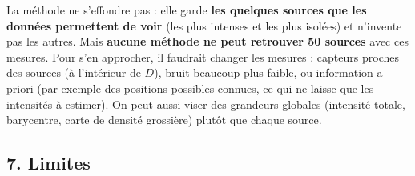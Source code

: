 \documentclass[
  french,
]{article}
\begin{document}
La méthode ne s'effondre pas : elle garde \textbf{les quelques sources
que les données permettent de voir} (les plus intenses et les plus
isolées) et n'invente pas les autres. Mais \textbf{aucune méthode ne
peut retrouver 50 sources} avec ces mesures. Pour s'en approcher, il
faudrait changer les mesures : capteurs proches des sources (à
l'intérieur de \(D\)), bruit beaucoup plus faible, ou information a
priori (par exemple des positions possibles connues, ce qui ne laisse
que les intensités à estimer). On peut aussi viser des grandeurs
globales (intensité totale, barycentre, carte de densité grossière)
plutôt que chaque source.

\subsection{7. Limites}\label{limites}
\end{document}
